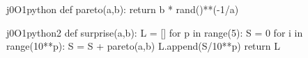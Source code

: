 \auteur{}

\begin{SaveVerbatim}{j0O1python}
    def pareto(a,b):
        return b * rand()**(-1/a)
\end{SaveVerbatim}

\begin{SaveVerbatim}{j0O1python2}
    def surprise(a,b):
        L = []
        for p in range(5):
            S = 0
            for i in range(10**p):
                S = S + pareto(a,b)
            L.append(S/10**p)
        return L
\end{SaveVerbatim}

